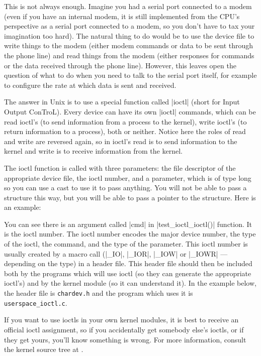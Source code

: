 \documentclass[10pt, oneside]{book}
\begin{document}
This is not always enough.
Imagine you had a serial port connected to a modem (even if you have an internal modem, it is still implemented from the CPU's perspective as a serial port connected to a modem, so you don't have to tax your imagination too hard).
The natural thing to do would be to use the device file to write things to the modem (either modem commands or data to be sent through the phone line) and read things from the modem (either responses for commands or the data received through the phone line).
However, this leaves open the question of what to do when you need to talk to the serial port itself, for example to configure the rate at which data is sent and received.

The answer in Unix is to use a special function called \cpp|ioctl| (short for Input Output ConTroL).
Every device can have its own \cpp|ioctl| commands, which can be read ioctl's (to send information from a process to the kernel), write ioctl's (to return information to a process), both or neither.
Notice here the roles of read and write are reversed again, so in ioctl's read is to send information to the kernel and write is to receive information from the kernel.

The ioctl function is called with three parameters: the file descriptor of the appropriate device file, the ioctl number, and a parameter, which is of type long so you can use a cast to use it to pass anything.
You will not be able to pass a structure this way, but you will be able to pass a pointer to the structure.
Here is an example:


You can see there is an argument called \cpp|cmd| in \cpp|test_ioctl_ioctl()| function.
It is the ioctl number.
The ioctl number encodes the major device number, the type of the ioctl, the command, and the type of the parameter.
This ioctl number is usually created by a macro call (\cpp|_IO|, \cpp|_IOR|, \cpp|_IOW| or \cpp|_IOWR| --- depending on the type) in a header file.
This header file should then be included both by the programs which will use ioctl (so they can generate the appropriate ioctl's) and by the kernel module (so it can understand it).
In the example below, the header file is \verb|chardev.h| and the program which uses it is \verb|userspace_ioctl.c|.

If you want to use ioctls in your own kernel modules, it is best to receive an official ioctl assignment, so if you accidentally get somebody else's ioctls, or if they get yours, you'll know something is wrong.
For more information, consult the kernel source tree at .
\end{document}
